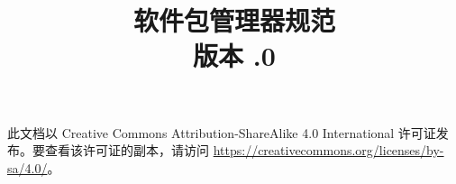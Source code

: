 \documentclass[fontset=none]{pms}
\title{软件包管理器规范 \\ {\large 版本 \TheCurrentEAPI .0}}
\author{%
}
\begin{document}
\maketitle

\thispagestyle{empty}
\vspace*{\fill}
{%
    \small
    此文档以 Creative Commons Attribution-ShareAlike 4.0 International
    许可证发布。要查看该许可证的副本，请访问
    \url{https://creativecommons.org/licenses/by-sa/4.0/}。

    \commitinfo
}

\tableofcontents
\listofalgorithms
\listoflistings
\listoftables


























\end{document}
